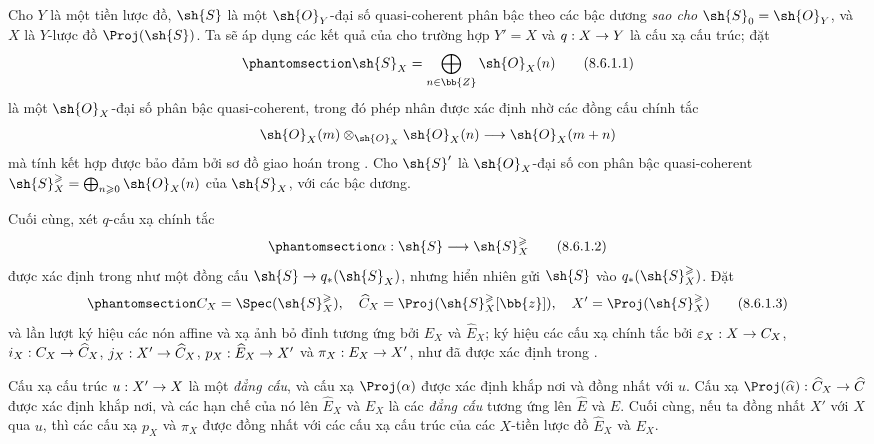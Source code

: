 \documentclass[oneside,10pt]{amsart}
\makeatletter
\renewcommand{\geq}{\geqslant}
\newcommand{\ega@arrow}[2]{\mathchoice{#1}{#2}{#2}{#2}}
\renewcommand{\to}{\ega@arrow{\longrightarrow}{\rightarrow}}
\newcommand{\oldpage}[2][]{\marginnote{\normalfont\footnotesize\textbf{#1}~|~#2}\ignorespaces}
\let\EGAOriginalLabel\label
\renewcommand{\label}[1]{\phantomsection\EGAOriginalLabel{#1}}
\makeatother
\begin{document}
\begin{env}[8.6.1]
\label{II.8.6.1}
Cho $Y$ là một tiền lược đồ, $\sh{S}$ là một $\sh{O}_Y$-đại số quasi-coherent phân bậc theo các bậc dương \emph{sao cho $\sh{S}_0=\sh{O}_Y$}, và $X$ là $Y$-lược đồ $\Proj(\sh{S})$.
Ta sẽ áp dụng các kết quả của  cho trường hợp $Y'=X$ và $q:X\to Y$ là cấu xạ cấu trúc;
đặt
\[
\label{II.8.6.1.1}
  \sh{S}_X=\bigoplus_{n\in\bb{Z}}\sh{O}_X(n)
  \tag{8.6.1.1}
\]
\oldpage[II]{172}
là một $\sh{O}_X$-đại số phân bậc quasi-coherent, trong đó phép nhân được xác định nhờ các đồng cấu chính tắc 
\[
  \sh{O}_X(m)\otimes_{\sh{O}_X}\sh{O}_X(n)\to\sh{O}_X(m+n)
\]
mà tính kết hợp được bảo đảm bởi sơ đồ giao hoán trong .
Cho $\sh{S}'$ là $\sh{O}_X$-đại số con phân bậc quasi-coherent $\sh{S}_X^\geq=\bigoplus_{n\geq0}\sh{O}_X(n)$ của $\sh{S}_X$, với các bậc dương.

Cuối cùng, xét $q$-cấu xạ chính tắc
\[
\label{II.8.6.1.2}
  \alpha: \sh{S} \to \sh{S}_X^\geq
\tag{8.6.1.2}
\]
được xác định trong  như một đồng cấu $\sh{S}\to q_*(\sh{S}_X)$, nhưng hiển nhiên gửi $\sh{S}$ vào $q_*(\sh{S}_X^\geq)$.
Đặt
\[
\label{II.8.6.1.3}
  C_X = \Spec(\sh{S}_X^\geq),
  \quad
  \widehat{C}_X = \Proj(\sh{S}_X^\geq[\bb{z}]),
  \quad
  X' = \Proj(\sh{S}_X^\geq)
\tag{8.6.1.3}
\]
và lần lượt ký hiệu các nón affine và xạ ảnh bỏ đỉnh tương ứng bởi $E_X$ và $\widehat{E}_X$;
ký hiệu các cấu xạ chính tắc bởi $\varepsilon_X:X\to C_X$, $i_X:C_X\to\widehat{C}_X$, $j_X:X'\to\widehat{C}_X$, $p_X:\widehat{E}_X\to X'$ và $\pi_X:E_X\to X'$, như đã được xác định trong .
\end{env}
\begin{proposition}[8.6.2]
\label{II.8.6.2}
Cấu xạ cấu trúc $u:X'\to X$ là một \emph{đẳng cấu}, và cấu xạ $\Proj(\alpha)$ được xác định khắp nơi và đồng nhất với $u$.
Cấu xạ $\Proj(\widehat{\alpha}):\widehat{C}_X\to\widehat{C}$ được xác định khắp nơi, và các hạn chế của nó lên $\widehat{E}_X$ và $E_X$ là các \emph{đẳng cấu} tương ứng lên $\widehat{E}$ và $E$.
Cuối cùng, nếu ta đồng nhất $X'$ với $X$ qua $u$, thì các cấu xạ $p_X$ và $\pi_X$ được đồng nhất với các cấu xạ cấu trúc của các $X$-tiền lược đồ $\widehat{E}_X$ và $E_X$.
\end{proposition}
\end{document}
